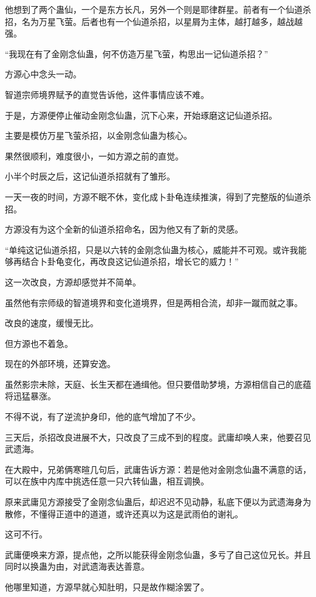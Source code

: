 \begin{this_body}
他想到了两个蛊仙，一个是东方长凡，另外一个则是耶律群星。前者有一个仙道杀招，名为万星飞萤。后者也有一个仙道杀招，以星屑为主体，越打越多，越战越强。

“我现在有了金刚念仙蛊，何不仿造万星飞萤，构思出一记仙道杀招？”

方源心中念头一动。

智道宗师境界赋予的直觉告诉他，这件事情应该不难。

于是，方源便停止催动金刚念仙蛊，沉下心来，开始琢磨这记仙道杀招。

主要是模仿万星飞萤杀招，以金刚念仙蛊为核心。

果然很顺利，难度很小，一如方源之前的直觉。

小半个时辰之后，这记仙道杀招就有了雏形。

一天一夜的时间，方源不眠不休，变化成卜卦龟连续推演，得到了完整版的仙道杀招。

方源没有为这个全新的仙道杀招命名，因为他又有了新的灵感。

“单纯这记仙道杀招，只是以六转的金刚念仙蛊为核心，威能并不可观。或许我能够再结合卜卦龟变化，再改良这记仙道杀招，增长它的威力！”

这一次改良，方源却感觉并不简单。

虽然他有宗师级的智道境界和变化道境界，但是两相合流，却非一蹴而就之事。

改良的速度，缓慢无比。

但方源也不着急。

现在的外部环境，还算安逸。

虽然影宗未除，天庭、长生天都在通缉他。但只要借助梦境，方源相信自己的底蕴将迅猛暴涨。

不得不说，有了逆流护身印，他的底气增加了不少。

三天后，杀招改良进展不大，只改良了三成不到的程度。武庸却唤人来，他要召见武遗海。

在大殿中，兄弟俩寒暄几句后，武庸告诉方源：若是他对金刚念仙蛊不满意的话，可以在族中内库中挑选任意一只六转仙蛊，相互调换。

原来武庸见方源接受了金刚念仙蛊后，却迟迟不见动静，私底下便以为武遗海身为散修，不懂得正道中的道道，或许还真以为这是武雨伯的谢礼。

这可不行。

武庸便唤来方源，提点他，之所以能获得金刚念仙蛊，多亏了自己这位兄长。并且同时以换蛊为由，对武遗海表达善意。

他哪里知道，方源早就心知肚明，只是故作糊涂罢了。


\end{this_body}
